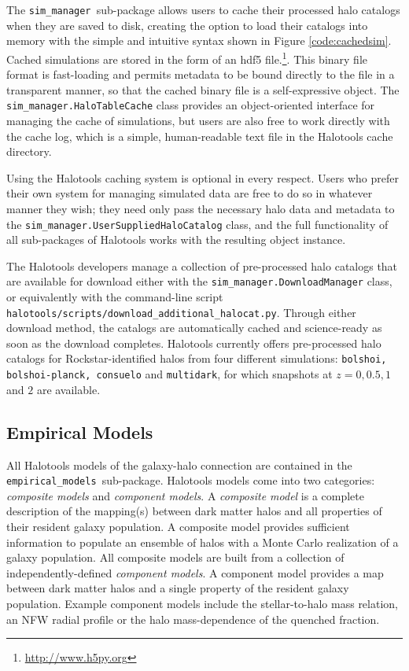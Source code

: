 \documentclass[twocolumn, tighten]{aastex6}
\newcommand{\emodels}{{\tt empirical\_models }}
\newcommand{\sims}{{\tt sim\_manager }}
\begin{document}
The \sims sub-package allows users to cache their processed halo catalogs when they are saved to disk, creating the option to load their catalogs into memory with the simple and intuitive syntax shown in Figure \ref{code:cachedsim}. Cached simulations are stored in the form of an hdf5 file.\footnote{\url{http://www.h5py.org}}\citep{hdf5}. This binary file format is fast-loading and permits metadata to be bound directly to the file in a transparent manner, so that the cached binary file is a self-expressive object. The {\tt sim\_manager.HaloTableCache} class provides an object-oriented interface for managing the cache of simulations, but users are also free to work directly with the cache log, which is a simple, human-readable text file in the Halotools cache directory.

Using the Halotools caching system is optional in every respect. Users who prefer their own system for managing simulated data are free to do so in whatever manner they wish; they need only pass the necessary halo data and metadata to the {\tt sim\_manager.UserSuppliedHaloCatalog} class, and the full functionality of all sub-packages of Halotools works with the resulting object instance.  

The Halotools developers manage a collection of pre-processed halo catalogs that are available for download either with the {\tt sim\_manager.DownloadManager} class, or equivalently with the command-line script {\tt halotools/scripts/download\_additional\_halocat.py}. Through either download method, the catalogs are automatically cached and science-ready as soon as the download completes. Halotools currently offers pre-processed halo catalogs for Rockstar-identified halos from four different simulations: {\tt bolshoi, bolshoi-planck, consuelo} and {\tt multidark}, for which snapshots at $z=0, 0.5, 1$ and $2$ are available.

\subsection{Empirical Models}
\label{subsection:empirical_models}

All Halotools models of the galaxy-halo connection are contained in the \emodels sub-package. Halotools models come into two categories: {\em composite models} and {\em component models}. 
A {\em composite model} is a complete description of the mapping(s) between dark matter halos and all properties of their resident galaxy population. A composite model provides sufficient information to populate an ensemble of halos with a Monte Carlo realization of a galaxy population. All composite models are built from a collection of independently-defined {\em component models}. A component model provides a map between dark matter halos and a single property of the resident galaxy population. Example component models include the stellar-to-halo mass relation, an NFW radial profile or the halo mass-dependence of the quenched fraction.
\end{document}
